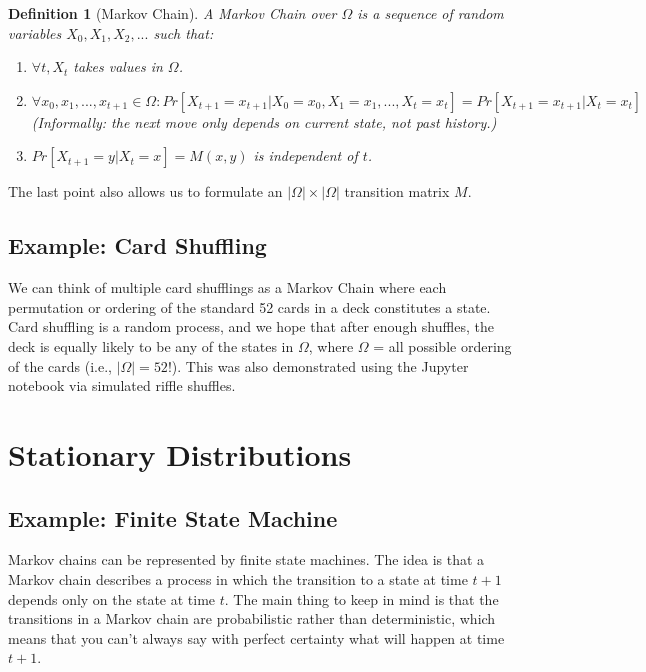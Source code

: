 \documentclass[twoside]{article}
\newtheorem{definition}[theorem]{Definition}
\begin{document}
\begin{definition}[Markov Chain]
   A Markov Chain over $\Omega$ is a sequence of random variables $X_0, X_1, X_2, ...$ such that:
   \begin{enumerate}
      \item $\forall t, X_t$ takes values in $\Omega$.
      \item $\forall x_0, x_1, ..., x_{t+1} \in \Omega: Pr[X_{t+1} = x_{t+1}|X_0 = x_0, X_1 = x_1, ..., X_t = x_t] = Pr[X_{t+1} = x_{t+1}|X_t = x_t]$ \\
      (Informally: the next move only depends on current state, not past history.)
      \item $Pr[X_{t+1} = y|X_t = x] = M(x, y)$ is independent of $t$.
   \end{enumerate}
\end{definition}

The last point also allows us to formulate an $|\Omega| \times |\Omega|$ transition matrix $M$.

\subsection{Example: Card Shuffling}

We can think of multiple card shufflings as a Markov Chain where each permutation or ordering of the standard 52 cards in a deck constitutes a state. Card shuffling is a random process, and we hope that after enough shuffles, the deck is equally likely to be any of the states in $\Omega$, where $\Omega$ = all possible ordering of the cards (i.e., $|\Omega| = 52!$). This was also demonstrated using the Jupyter notebook via simulated riffle shuffles.


\section{Stationary Distributions}

\subsection{Example: Finite State Machine}
Markov chains can be represented by finite state machines. The idea is that a Markov chain describes a process in which the transition to a state at time $t+1$ depends only on the state at time $t$. The main thing to keep in mind is that the transitions in a Markov chain are probabilistic rather than deterministic, which means that you can't always say with perfect certainty what will happen at time $t+1$.
\end{document}
